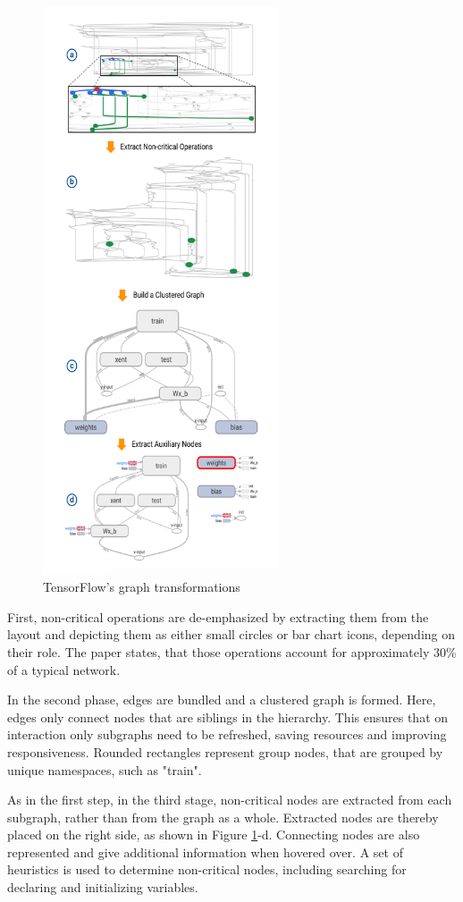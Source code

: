 \documentclass{acmsiggraph}               %
\begin{document}
\begin{figure}[!htb]
\includegraphics[width=2.75in]{transformations_Wongsuphasawat_et_al}
\caption{TensorFlow's graph transformations \protect\cite{Wongsuphasawat2018}}
\label{fig:transformations}
\end{figure}

First, non-critical operations are de-emphasized by extracting them from the layout and depicting them as either small circles or bar chart icons, depending on their role. The paper states, that those operations account for approximately 30\% of a typical network.

In the second phase, edges are bundled and a clustered graph is formed. Here, edges only connect nodes that are siblings in the hierarchy. This ensures that on interaction only subgraphs need to be refreshed, saving resources and improving responsiveness. Rounded rectangles represent group nodes, that are grouped by unique namespaces, such as "train".

As in the first step, in the third stage, non-critical nodes are extracted from each subgraph, rather than from the graph as a whole. Extracted nodes are thereby placed on the right side, as shown in Figure \ref{fig:transformations}-d. Connecting nodes are also represented and give additional information when hovered over. A set of heuristics is used to determine non-critical nodes, including searching for declaring and initializing variables.
\end{document}

